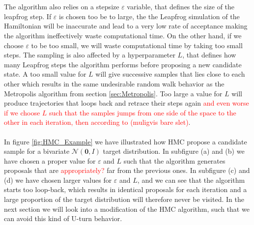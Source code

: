 \\
\\
The algorithm also relies on a stepsize $\varepsilon$ variable, that defines the size of the leapfrog step. If $\varepsilon$ is chosen too be to large, the the Leapfrog simulation of the Hamiltonian will be inaccurate and lead to a very low rate of acceptance making the algorithm ineffectively waste computational time. On the other hand, if we choose $\varepsilon$ to be too small, we will waste computational time by taking too small steps. The sampling is also affected by a hyperparameter $L$, that defines how many Leapfrog steps the algorithm performs before proposing a new candidate state. A too small value for $L$ will give successive samples that lies close to each other which results in the same undesirable random walk behavior as the Metropolis algorithm from section \ref{sec:Metropolis}. Too large a value for $L$ will produce trajectories that loops back and retrace their steps again \textcolor{red}{and even worse if we choose $L$ such that the samples jumps from one side of the space to the other in each iteration, then according to (muligvis bare slet)}. \\
\\
In figure \ref{fig:HMC_Example} we have illustrated how HMC propose a candidate sample for a bivariate $\mathcal{N}\left(\mathbf{0},\mathit{I}\right)$ target distribution. In subfigure (a) and (b) we have chosen a proper value for $\varepsilon$ and $L$ such that the algorithm generates proposals that are \textcolor{red}{appropriately?} far from the previous ones. In subfigure (c) and (d) we have chosen larger values for $\varepsilon$ and $L$, and we can see that the algorithm starts too loop-back, which results in identical proposals for each iteration and a large proportion of the target distribution will therefore never be visited. In the next section we will look into a modification of the HMC algorithm, such that we can avoid this kind of U-turn behavior.  


